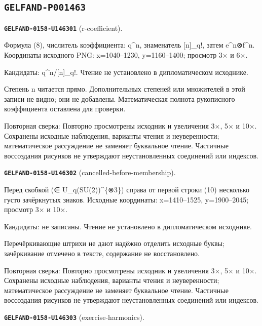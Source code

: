 \subsection*{\texttt{GELFAND-P001463}}
\par\noindent\leavevmode{}\label{GELFAND-0158-U146301}\label{GELFAND-P001463:r-coefficient}\textbf{\texttt{GELFAND-0158-U146301}} (r-coefficient).\nopagebreak[4]\par
Формула (8), числитель коэффициента: q\textasciicircum{}n, знаменатель [n]\_q!, затем e\textasciicircum{}n⊗f\textasciicircum{}n. Координаты исходного PNG: x=1040–1230, y=1160–1400; просмотр 3× и 6×.\par
Кандидаты: q\textasciicircum{}n/[n]\_q!. Чтение не установлено в дипломатическом исходнике.\par
Степень n читается прямо. Дополнительных степеней или множителей в этой записи не видно; они не добавлены. Математическая полнота рукописного коэффициента оставлена для проверки.\par
Повторная сверка: Повторно просмотрены исходник и увеличения 3×, 5× и 10×. Сохранены исходные наблюдения, варианты чтения и неуверенности; математическое рассуждение не заменяет буквальное чтение. Частичные воссоздания рисунков не утверждают неустановленных соединений или индексов.\par\medskip
\par\noindent\leavevmode{}\label{GELFAND-0158-U146302}\label{GELFAND-P001463:cancelled-before-membership}\textbf{\texttt{GELFAND-0158-U146302}} (cancelled-before-membership).\nopagebreak[4]\par
Перед скобкой (∈ U\_q(SU(2))\textasciicircum{}\{⊗3\}) справа от первой строки (10) несколько густо зачёркнутых знаков. Исходные координаты: x=1410–1525, y=1900–2045; просмотр 3× и 10×.\par
Кандидаты: не записаны. Чтение не установлено в дипломатическом исходнике.\par
Перечёркивающие штрихи не дают надёжно отделить исходные буквы; зачёркивание отмечено в тексте, содержание не восстановлено.\par
Повторная сверка: Повторно просмотрены исходник и увеличения 3×, 5× и 10×. Сохранены исходные наблюдения, варианты чтения и неуверенности; математическое рассуждение не заменяет буквальное чтение. Частичные воссоздания рисунков не утверждают неустановленных соединений или индексов.\par\medskip
\par\noindent\leavevmode{}\label{GELFAND-0158-U146303}\label{GELFAND-P001463:exercise-harmonics}\textbf{\texttt{GELFAND-0158-U146303}} (exercise-harmonics).\nopagebreak[4]\par
